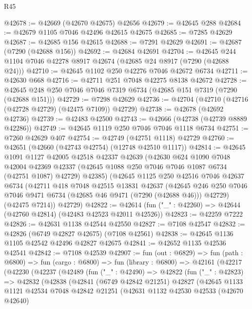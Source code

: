 \begin{lexlean}{R45}
\begin{coremodule}
{@42678 := @42669 (@42670 @42675) @42656
@42679 := @42645 @288
@42684 := @42679 @1105 @7046 @42496 @42615 @42675
@42685 := @7285 @42629
@42687 := @42685 @156 @42615
@42688 := @7291 @42629
@42691 := @42687 (@7290 (@42688 @156))
@42692 := @42684 @42691
@42704 := @42645 @244 @1104 @7046 @42278 @8917 @42674 (@42685 @24 @8917 (@7290 (@42688 @24)))
@42710 := @42645 @1102 @250 @42276 @7046 @42672 @6734
@42711 := @42630 @668
@42716 := @42711 @251 @7048 @42275 @8138 @42672
@42728 := @42645 @248 @250 @7046 @7046 @7319 @6734 (@42685 @151 @7319 (@7290 (@42688 @151)))
@42729 := @7298 @42629
@42736 := @42704 (@42710 (@42716 (@42728 @42729) (@42475 @7109)) @42729)
@42738 := @42678 (@42692 @42736)
@42739 := @42483 @42500
@42743 := @42666 (@42738 (@42739 @8889 @42286))
@42749 := @42645 @1119 @250 @7046 @7046 @1118 @6734
@42751 := @7260 @42629 @407
@42754 := @42749 (@42751 @1118) @42729
@42760 := @42651 (@42660 (@42743 @42754) (@12748 @42510 @1117))
@42814 := @42645
    @1091
    @1127
    @42005
    @42518
    @42337
    @42639
    (@42630
      @624
      @1090
      @7048
      @42004
      @42369
      @42337
      (@42645 @1088 @250 @7046 @7046 @1087 @6734 (@42751 @1087) @42729)
      @42385)
    (@42645
      @1125
      @250
      @42516
      @7046
      @42637
      @6734
      (@42711
        @418
        @7048
        @42515
        @13831
        @42637
        (@42645 @246 @250 @7046 @7046 @9471 @6734 (@42685 @46 @9471 (@7290 (@42688 @46))) @42729)
        (@42475 @7214))
      @42729)
@42822 := @42614 (fun ("_" : @42260) => @42644 (@42760 @42814) (@42483 @42523 @42011 @42526))
@42823 := @42259 @7222
@42826 := @42631 @1138 @42544 @42550
@42827 := @7108 @42547
@42832 := @42826 (@6749 @42827 @42675) (@7108 @42561)
@42838 := @42645 @1136 @1105 @42542 @42496 @42827 @42675
@42841 := @42652 @1135 @42536 @42541
@42842 := @7108 @42539
@42907 := fun (out : @6829) =>
  fun (path : @6800) =>
  fun (cargo : @6800) =>
  fun (library : @6800) =>
  @42161
    (@42217
      (@42230
        (@42237
          (@42489
            (fun ("_" : @42490) =>
            @42822
              (fun ("_" : @42823) =>
              @42832
                (@42838
                  (@42841
                    (@6749 @42842 @21251)
                    @42827
                    (@42645
                      @1133
                      @1121
                      @42534
                      @7048
                      @42842
                      @21251
                      (@42631
                        @1132
                        @42530
                        @42533
                        (@42670 @42640)
}
\end{coremodule}
\end{lexlean}

